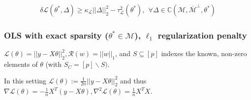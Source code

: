\documentclass[11pt]{article}
\begin{document}
\begin{gather*}
    \delta \mathcal{L}(\theta^*, \Delta)
    \geq \kappa_\mathcal{L}||\Delta||_2^2 - \tau^2_\mathcal{L}(\theta^*), \ \ \forall \Delta \in \mathbb{C}(\mathcal{M}, \overline{\mathcal{M}}^\perp, \theta^*)
\end{gather*}


\subsubsection{OLS  with exact sparsity ($\theta^* \in \mathcal{M}$), $\ell_1$ regularization penalty}
  
$\mathcal{L}(\theta) = ||y-X\theta||_2^2, \mathcal{R}(w) = ||w||_1$, and $S \subseteq[p]$ indexes the known, non-zero elements of $\theta$ (with $S_C = [p]\backslash S)$. \newline 

In this setting $\mathcal{L}(\theta) := \frac{1}{2n}||y-X\theta||_2^2$ and thus $\nabla\mathcal{L}(\theta) = -\frac{1}{n}X^T(y-X\theta), \nabla^2\mathcal{L}(\theta) = \frac{1}{n}X^TX$. \newline 
\end{document}
